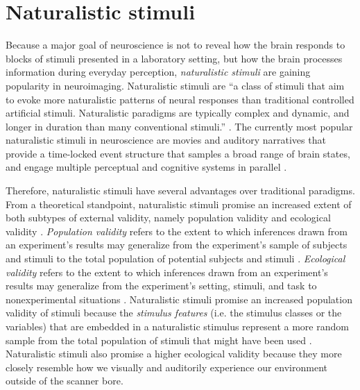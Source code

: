 \section{Naturalistic stimuli}
Because a major goal of neuroscience is not to reveal how the brain responds to
blocks of stimuli presented in a laboratory setting, but how the brain processes
information during everyday perception, \textit{naturalistic stimuli} are
gaining popularity in neuroimaging.
Naturalistic stimuli are ``a class of stimuli that aim to evoke more
naturalistic patterns of neural responses than traditional controlled artificial
stimuli. Naturalistic paradigms are typically complex and dynamic, and longer in
duration than many conventional stimuli.'' \citep[][p. 2]{vanderwal2019movies}.
The currently most popular naturalistic stimuli in neuroscience are movies and
auditory narratives \citep[cf.][for an introduction]{sonkusare2019naturalistic}
that provide a time-locked event structure that samples a broad range of brain
states, and engage multiple perceptual and cognitive systems in parallel
\citep{haxby2020naturalistic}.

%
Therefore, naturalistic stimuli have several advantages over traditional
paradigms.
From a theoretical standpoint, naturalistic stimuli promise an increased
extent of both subtypes of external validity, namely population validity and
ecological validity \citep{bracht1968external}.
%
\textit{Population validity} refers to the extent to which inferences drawn from
an experiment's results may generalize from the experiment's sample of subjects
and stimuli to the total population of potential subjects and stimuli
\citep{bracht1968external, westfall2016fixing}.
%
\textit{Ecological validity} refers to the extent to which inferences drawn from
an experiment's results may generalize from the experiment's setting, stimuli,
and task to nonexperimental situations \citep{bracht1968external,
orne1962social, schmuckler2001ecological}.
Naturalistic stimuli promise an increased population validity of stimuli because
the \textit{stimulus features} (i.e. the stimulus classes or the variables) that
are embedded in a naturalistic stimulus represent a more random sample from the
total population of stimuli that might have been used
\citep{westfall2016fixing}.
Naturalistic stimuli also promise a higher ecological validity
\citep{hasson2012future} because they more closely resemble how we visually and
auditorily experience our environment outside of the scanner bore.

